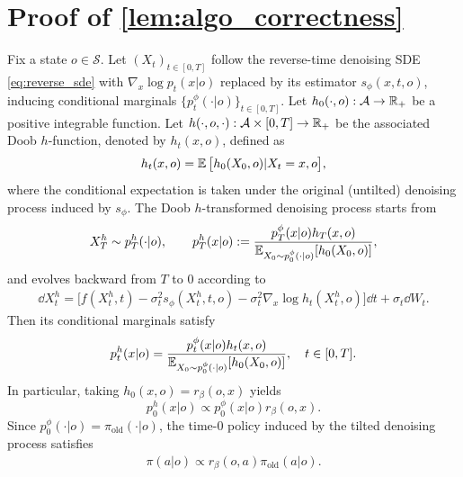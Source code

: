 \section{\texorpdfstring{Proof of \cref{lem:algo_correctness}}{Proof of Theorem \ref{lem:algo_correctness}}}
\label{sec:proof_corr}
\begin{lemma}
Fix a state $o \in\mathcal{S}$.
Let $(X_t)_{t\in[0,T]}$ follow the reverse-time denoising SDE \eqref{eq:reverse_sde} with $\nabla_x \log p_t(x|o)$ replaced by its estimator $s_\phi(x,t,o)$, inducing conditional marginals 
$\{p_t^\phi(\cdot|o)\}_{t\in[0,T]}$.
Let $h_0(\cdot,o):\mathcal{A}\to\mathbb{R}_+$ be a positive integrable function.
Let $h(\cdot,o,\cdot):\mathcal{A}\times[0,T]\to \mathbb{R}_+$ be the associated Doob $h$-function, denoted by $h_t(x,o)$, defined as
\begin{align*}
    h_t(x,o)
    =
    \operatorname*{{\mathbb{E}}} \big[h_0(X_0,o)| X_t=x,o\big],
\end{align*}
where the conditional expectation is taken under the original (untilted) denoising process induced by $s_\phi$.
The Doob $h$-transformed denoising process starts from
\[
    X_T^h \sim p_T^h(\cdot|o),
    \qquad
    p_T^h(x|o)
    :=
    \frac{
        p_T^\phi(x|o) h_T(x,o)
    }{
        \operatorname*{{\mathbb{E}}}_{X_0\sim p_0^{\phi}(\cdot|o)}[h_0(X_0,o)]
    },
\]
and evolves backward from $T$ to $0$ according to
\begin{align*}
    \dd X_t^{h}
    =
    \Big[
        f(X_t^{h},t)
        -\sigma_t^2 s_\phi(X_t^{h},t,o)
        -\sigma_t^2 \nabla_x \log h_t(X_t^{h},o)
    \Big]\dd t
    +\sigma_t\dd W_t.
\end{align*}
Then its conditional marginals satisfy
\begin{align*}
    p_t^{h}(x|o)
    =
    \frac{
        p_t^\phi(x|o)h_t(x,o)
    }{
        \operatorname*{{\mathbb{E}}}_{X_0\sim p_0^{\phi}(\cdot|o)}[h_0(X_0,o)]
    },
    \quad t\in[0,T].
\end{align*}
In particular, taking $h_0(x,o)=r_\beta(o,x)$ yields
\[
    p_0^h(x|o)
    \propto
    p_0^{\phi}(x|o)r_\beta(o,x).
\]
Since $p_0^{\phi}(\cdot|o)=\pi_{\mathrm{old}}(\cdot|o)$, the time-$0$ policy induced by the tilted denoising process satisfies
\begin{align*}
    \pi(a|o)
    \propto
    r_\beta(o,a)\pi_{\mathrm{old}}(a|o).
\end{align*}
\end{lemma}



